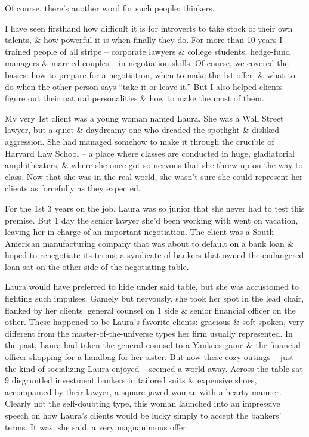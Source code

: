 \documentclass{article}
\numberwithin{equation}{section}
\begin{document}
Of course, there's another word for such people: thinkers.

I have seen firsthand how difficult it is for introverts to take stock of their own talents, \& how powerful it is when finally they do. For more than 10 years I trained people of all stripe -- corporate lawyers \& college students, hedge-fund managers \& married couples -- in negotiation skills. Of course, we covered the basics: how to prepare for a negotiation, when to make the 1st offer, \& what to do when the other person says ``take it or leave it.'' But I also helped clients figure out their natural personalities \& how to make the most of them.

My very 1st client was a young woman named Laura. She was a Wall Street lawyer, but a quiet \& daydreamy one who dreaded the spotlight \& disliked aggression. She had managed somehow to make it through the crucible of Harvard Law School -- a place where classes are conducted in huge, gladiatorial amphitheaters, \& where she once got so nervous that she threw up on the way to class. Now that she was in the real world, she wasn't sure she could represent her clients as forcefully as they expected.

For the 1st 3 years on the job, Laura was so junior that she never had to test this premise. But 1 day the senior lawyer she'd been working with went on vacation, leaving her in charge of an important negotiation. The client was a South American manufacturing company that was about to default on a bank loan \& hoped to renegotiate its terms; a syndicate of bankers that owned the endangered loan sat on the other side of the negotiating table.

Laura would have preferred to hide under said table, but she was accustomed to fighting such impulses. Gamely but nervously, she took her spot in the lead chair, flanked by her clients: general counsel on 1 side \& senior financial officer on the other. These happened to be Laura's favorite clients: gracious \& soft-spoken, very different from the master-of-the-universe types her firm usually represented. In the past, Laura had taken the general counsel to a Yankees game \& the financial officer shopping for a handbag for her sister. But now these cozy outings -- just the kind of socializing Laura enjoyed -- seemed a world away. Across the table sat 9 disgruntled investment bankers in tailored suits \& expensive shoes, accompanied by their lawyer, a square-jawed woman with a hearty manner. Clearly not the self-doubting type, this woman launched into an impressive speech on how Laura's clients would be lucky simply to accept the bankers' terms. It was, she said, a very magnanimous offer.
\end{document}
